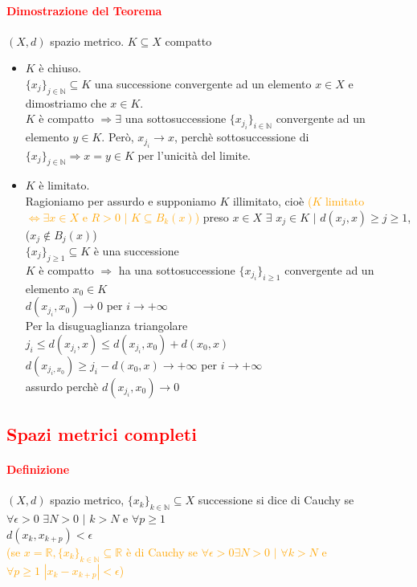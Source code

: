 \documentclass{article}
\newcommand{\R}{\mathbb{R}}
\newcommand{\N}{\mathbb{N}}
\begin{document}
\paragraph{\textcolor{red}{Dimostrazione del Teorema}}
$(X,d)$ spazio metrico. $K \subseteq X$ compatto
\begin{itemize}
    \item $K$ è chiuso.\\
    $\{x_j\}_{j\in\N}\subseteq K$ una successione convergente ad un elemento $x \in X$ e dimostriamo che $x \in K$.\\
    $K$ è compatto $\Rightarrow \exists$ una sottosuccessione $\{x_{j_i}\}_{i\in\N}$ convergente ad un elemento $y \in K$. Però, $x_{j_i} \rightarrow x$, perchè sottosuccessione di $\{x_j\}_{j  \in \N} \Rightarrow x = y \in K$ per l'unicità del limite.
    \item $K $ è limitato.\\
    Ragioniamo per assurdo e supponiamo $K$ illimitato, cioè \textcolor{orange}{($K$ limitato $\Leftrightarrow \exists x \in X$ e $R>0 \,\, |\,\, K \subseteq B_k(x)$)} preso $x \in X \,\,\exists\,\, x_j \in K\,\, |\,\, d(x_j,x)\geq j\geq 1$, ($x_j\notin B_j(x)$)\\
    $\{x_j\}_{j\geq 1}\subseteq K$ è una successione\\ $K$ è compatto $ \Rightarrow$ ha una sottosuccessione $\{x_{j_i}\}_{i\geq 1}$ convergente ad un elemento $x_0 \in K$\\
    $d(x_{j_i},x_0)\rightarrow 0$ per $i \rightarrow+\infty$\\
    Per la disuguaglianza triangolare\\ $j_i \leq d(x_{j_i},x)\leq d(x_{j_i},x_0)+d(x_0,x)$\\
    $d(x_{j_i,x_0})\geq j_i - d(x_0,x)\rightarrow +\infty$ per $i \rightarrow +\infty$\\
    assurdo perchè $d(x_{j_i},x_0)\rightarrow 0$
\end{itemize}
\begin{flushright}
\large\Lightning
\end{flushright}

\subsection{\textcolor{red}{Spazi metrici completi}}
\paragraph{\textcolor{red}{Definizione}}
$(X,d)$ spazio metrico, $\{x_k\}_{k \in\N}\subseteq X$ successione si dice di Cauchy se $\forall \epsilon >0 \,\, \exists N >0 \,\,|\,\, k >N$ e $\forall p\geq 1$\\
$d(x_k,x_{k+p})<\epsilon$\\
\textcolor{orange}{(se $x=\R, \{x_k\}_{k \in\N}\subseteq\R$ è di Cauchy se $\forall \epsilon >0 \exists N >0 \,\, |\,\, \forall k>N$ e $\forall p \geq 1\,\, |x_k - x_{k+p}|<\epsilon$)}
\end{document}
